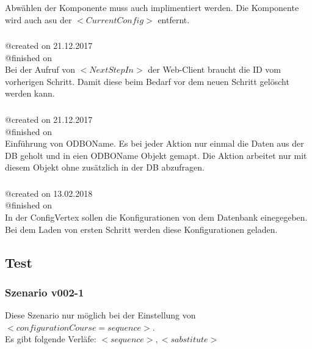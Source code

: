 \documentclass{article}
\begin{document}
Abw\"ahlen der Komponente muss auch implimentiert werden. Die Komponente wird
auch asu der $<CurrentConfig>$ entfernt.\\

\subsubsection{}
@created on 21.12.2017\\
@finished on \\

Bei der Aufruf von $<NextStepIn>$ der Web-Client braucht die ID vom vorherigen
Schritt. Damit diese beim Bedarf vor dem neuen Schritt gel\"oscht werden kann.

\subsubsection{}
@created on 21.12.2017\\
@finished on \\

Einf\"uhrung von ODBOName. Es bei jeder Aktion nur einmal die Daten aus der DB
geholt und in eien ODBOName Objekt gemapt. Die Aktion arbeitet nur mit diesem
Objekt ohne zus\"atzlich in der DB abzufragen.

\subsubsection{}
@created on 13.02.2018\\
@finished on \\

In der ConfigVertex sollen die Konfigurationen von dem Datenbank einegegeben.
Bei dem Laden von ersten Schritt werden diese Konfigurationen geladen.

\subsection{Test}

\subsubsection{Szenario v002-1}

Diese Szenario nur m\"oglich bei der Einstellung von
$<configurationCourse=sequence>$.\\

\noindent Es gibt folgende Verl\"afe: $<sequence>, <sabstitute>$
\end{document}
